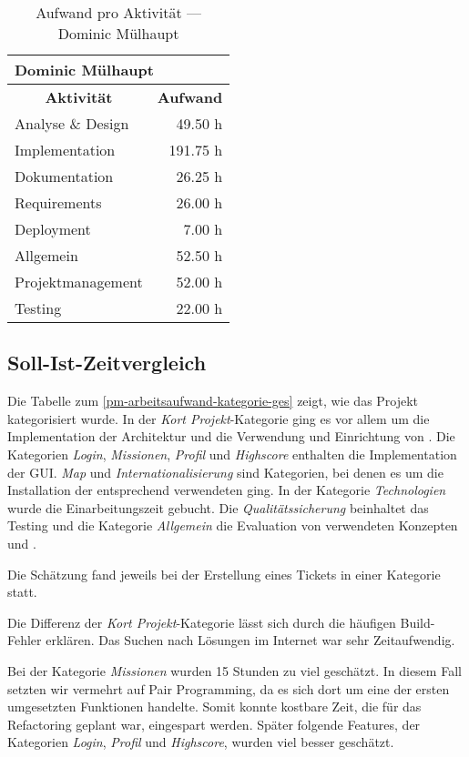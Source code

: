 \begin{table}[H]
\centering
\label{pm-arbeitsaufwand-aktivität-dm}
\begin{tabular}{|l|r|}
\hline
\multicolumn{2}{|l|}{\textbf{Dominic Mülhaupt}} \\
\hline
\multicolumn{1}{|c|}{\textbf{Aktivität}} & \multicolumn{1}{|c|}{\textbf{Aufwand}} \\
\hline
Analyse \& Design & 49.50 h \\
\hline
Implementation & 191.75 h \\
\hline
Dokumentation & 26.25 h \\
\hline
Requirements & 26.00 h \\
\hline
Deployment & 7.00 h \\
\hline
Allgemein & 52.50 h \\
\hline
Projektmanagement & 52.00 h \\
\hline
Testing & 22.00 h \\
\hline
\end{tabular}
\caption{Aufwand pro Aktivität --- Dominic Mülhaupt}
\end{table}


\subsection{Soll-Ist-Zeitvergleich}
Die Tabelle zum \ref{pm-arbeitsaufwand-kategorie-ges} zeigt, wie das Projekt kategorisiert wurde. 
In der \textit{Kort Projekt}-Kategorie ging es vor allem um die Implementation der Architektur und die Verwendung und Einrichtung von . 
Die Kategorien \textit{Login}, \textit{Missionen}, \textit{Profil} und \textit{Highscore} enthalten die Implementation der \gls{GUI}. 
\textit{Map} und \textit{Internationalisierung} sind Kategorien, bei denen es um die Installation der entsprechend verwendeten  ging. 
In der Kategorie \textit{Technologien} wurde die Einarbeitungszeit gebucht. 
Die \textit{Qualitätssicherung} beinhaltet das Testing und die Kategorie \textit{Allgemein} die Evaluation von verwendeten Konzepten und .

Die Schätzung fand jeweils bei der Erstellung eines Tickets in einer Kategorie statt. 

Die Differenz der \textit{Kort Projekt}-Kategorie lässt sich durch die häufigen Build-Fehler erklären. 
Das Suchen nach Lösungen im Internet war sehr Zeitaufwendig. 

Bei der Kategorie \textit{Missionen} wurden 15 Stunden zu viel geschätzt. 
In diesem Fall setzten wir vermehrt auf \gls{Pair Programming}, da es sich dort um eine der ersten umgesetzten Funktionen handelte.
Somit konnte kostbare Zeit, die für das Refactoring geplant war, eingespart werden. 
Später folgende Features, der Kategorien \textit{Login}, \textit{Profil} und \textit{Highscore}, wurden viel besser geschätzt.

